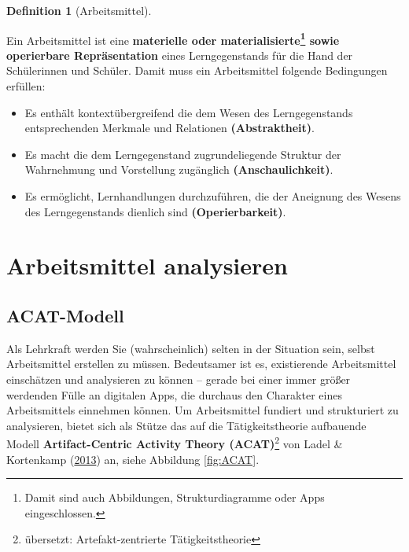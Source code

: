 \documentclass[
]{scrbook}
\providecommand{\tightlist}{%
  \setlength{\itemsep}{0pt}\setlength{\parskip}{0pt}}
\theoremstyle{definition}
\newtheorem{definition}{Definition}[chapter]
\theoremstyle{definition}
\theoremstyle{definition}
\theoremstyle{definition}
\theoremstyle{remark}
\begin{document}
\begin{definition}[Arbeitsmittel]
\protect\hypertarget{def:Arbeitsmittel}{}\label{def:Arbeitsmittel}

Ein Arbeitsmittel ist eine \textbf{materielle oder materialisierte\footnote{Damit sind auch Abbildungen, Strukturdiagramme oder Apps eingeschlossen.} sowie operierbare Repräsentation} eines Lerngegenstands für die Hand der Schülerinnen und Schüler. Damit muss ein Arbeitsmittel folgende Bedingungen erfüllen:

\begin{itemize}
\tightlist
\item
  Es enthält kontextübergreifend die dem Wesen des Lerngegenstands entsprechenden Merkmale und Relationen \textbf{(Abstraktheit)}.
\item
  Es macht die dem Lerngegenstand zugrundeliegende Struktur der Wahrnehmung und Vorstellung zugänglich \textbf{(Anschaulichkeit)}.
\item
  Es ermöglicht, Lernhandlungen durchzuführen, die der Aneignung des Wesens des Lerngegenstands dienlich sind \textbf{(Operierbarkeit)}.
\end{itemize}

\end{definition}

\hypertarget{arbeitsmittel-analysieren}{%
\section{Arbeitsmittel analysieren}\label{arbeitsmittel-analysieren}}

\hypertarget{acat-modell}{%
\subsection{ACAT-Modell}\label{acat-modell}}

Als Lehrkraft werden Sie (wahrscheinlich) selten in der Situation sein, selbst Arbeitsmittel erstellen zu müssen. Bedeutsamer ist es, existierende Arbeitsmittel einschätzen und analysieren zu können --
gerade bei einer immer größer werdenden Fülle an digitalen Apps, die durchaus den Charakter eines Arbeitsmittels einnehmen können. Um Arbeitsmittel fundiert und strukturiert zu analysieren, bietet sich als Stütze das auf die Tätigkeitstheorie aufbauende Modell \textbf{Artifact-Centric Activity Theory (ACAT)}\footnote{übersetzt: Artefakt-zentrierte Tätigkeitstheorie} von Ladel \& Kortenkamp (\protect\hyperlink{ref-Ladel2013}{2013}) an, siehe Abbildung \ref{fig:ACAT}.
\end{document}

